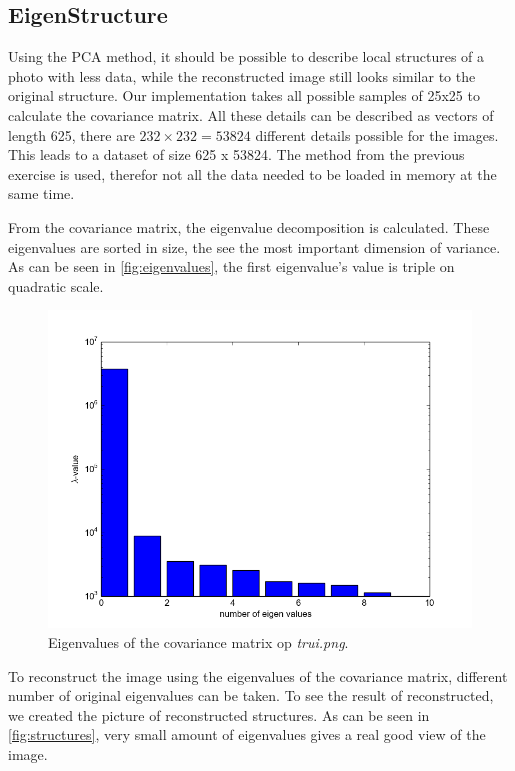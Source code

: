 \documentclass[a4paper,12px]{article}
\begin{document}
\subsection{EigenStructure}

Using the PCA method, it should be possible to describe local structures of a
photo with less data, while the reconstructed image still looks similar to the
original structure. Our implementation takes all possible samples of 25x25 to
calculate the covariance matrix. All these details can be described as vectors
of length 625, there are $232 \times 232 = 53824$ different details possible
for the images. This leads to a dataset of size 625 x 53824. The method from
the previous exercise is used, therefor not all the data needed to be loaded in
memory at the same time.


From the covariance matrix, the eigenvalue decomposition is calculated. These
eigenvalues are sorted in size, the see the most important dimension of
variance. As can be seen in \autoref{fig:eigenvalues}, the first eigenvalue's
value is triple on quadratic scale.

\begin{figure}[!h]
    \centering
    \includegraphics[width=\textwidth]{eigenvalues.png}
    \caption{Eigenvalues of the covariance matrix op \textit{trui.png}.}
    \label{fig:eigenvalues}
\end{figure}
\FloatBarrier

To reconstruct the image using the eigenvalues of the covariance matrix,
different number of original eigenvalues can be taken. To see the result of
reconstructed, we created the picture of reconstructed structures. As can be
seen in \autoref{fig:structures}, very small amount of eigenvalues gives a real
good view of the image.
\end{document}
